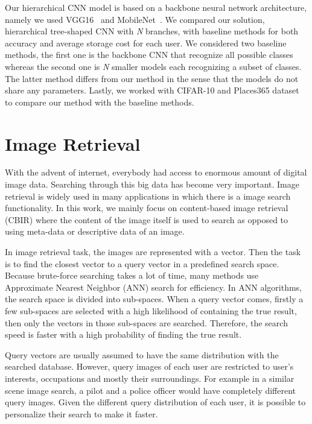 Our hierarchical CNN model is based on a backbone neural network architecture, namely we used VGG16~\cite{simonyan2014very} and MobileNet~\cite{howard2017mobilenets}. 
We compared our solution, hierarchical tree-shaped CNN with \textit{N} branches, with baseline methods for both accuracy and average storage cost for each user. 
We considered two baseline methods, the first one is the backbone CNN that recognize all possible classes 
whereas the second one is \textit{N} smaller models each recognizing a subset of classes.
The latter method differs from our method in the sense that the models do not share any parameters. 
Lastly, we worked with CIFAR-10 and Places365 dataset to compare our method with the baseline methods.


\section{Image Retrieval}

With the advent of internet, everybody had access to enormous amount of digital image data. 
Searching through this big data has become very important. 
Image retrieval is widely used in many applications 
in which there is a image search functionality. 
In this work, we mainly focus on content-based image retrieval (CBIR)
where the content of the image itself is used to search
as opposed to using meta-data or descriptive data of an image.

In image retrieval task, the images are represented with a vector.
Then the task is to find the closest vector to a query vector in a predefined search space. 
Because brute-force searching takes a lot of time, many methods use Approximate Nearest Neighbor (ANN) search for efficiency. 
In ANN algorithms, the search space is divided into sub-spaces. 
When a query vector comes, firstly a few sub-spaces are selected with a high likelihood of containing the true result, 
then only the vectors in those sub-spaces are searched.
Therefore, the search speed is faster with a high probability of finding the true result.

Query vectors are usually assumed to have the same distribution with the searched database. 
However, query images of each user are restricted to user's interests, occupations and mostly their surroundings.
For example in a similar scene image search, a pilot and a police officer would have completely different query images.
Given the different query distribution of each user, it is possible to personalize their search to make it faster.

